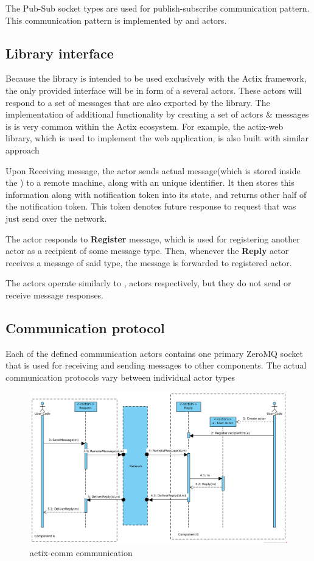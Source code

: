 The Pub-Sub socket types are used for publish-subscribe communication pattern. This communication pattern is implemented
by  and  actors.


\subsection{Library interface}
Because the library is intended to be used exclusively with the Actix framework, the only provided interface will be in form
of a several actors. These actors will respond to a set of messages that are also exported by the library.
The implementation of additional functionality by creating a set of actors \& messages is is very common within the Actix ecosystem.
For example, the actix-web library, which is used to implement the web application, is also built with similar approach

Upon Receiving  message, the  actor sends actual message(which is stored inside the
) to a remote machine, along with an unique identifier. It then stores
this information along with notification token into its state, and returns other half of the notification token.
This token denotes future response to request that was just send over the network.


The  actor responds to \textbf{Register} message, which is used for registering another actor
as a recipient of some message type. Then, whenever the \textbf{Reply} actor receives a message of said type, the message
is forwarded to registered actor.

The   actors operate similarly to ,  actors respectively,
but they do not send or receive message responses.

\subsection{Communication protocol}
Each of the defined communication actors contains one primary ZeroMQ socket that is used for receiving and sending messages
to other components. The actual communication protocols vary between individual actor types
\begin{figure}[H]
    \includegraphics[width=\textwidth]{obrazky-figures/actix_net_comm.png}
    \caption{actix-comm communication}
    \label{img:actix_comm}
\end{figure}


